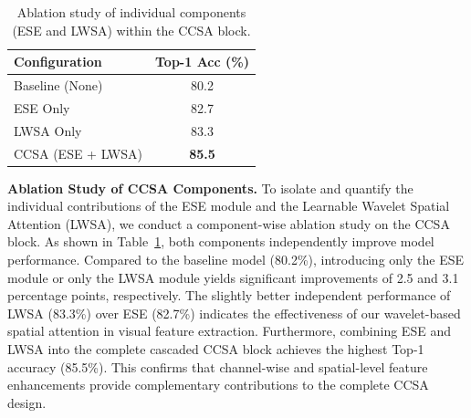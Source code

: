 \documentclass[a4paper,fleqn]{cas-dc}
\begin{document}
\begin{table}[pos=h]
\centering
\caption{{Ablation study of individual components (ESE and LWSA) within the CCSA block.}}
\label{tab:component_ablation}
\begin{tabular}{lc}
\toprule
\textbf{Configuration} & \textbf{Top-1 Acc (\%)} \\
\midrule
Baseline (None)     & 80.2 \\
ESE Only            & 82.7 \\
LWSA Only           & 83.3 \\
\rowcolor[gray]{0.92}
CCSA (ESE + LWSA)   & \textbf{85.5} \\
\bottomrule
\end{tabular}
\end{table}




{\textbf{Ablation Study of CCSA Components.} 
To isolate and quantify the individual contributions of the ESE module and the Learnable Wavelet Spatial Attention (LWSA), we conduct a component-wise ablation study on the CCSA block. As shown in Table~\ref{tab:component_ablation}, both components independently improve model performance. 
Compared to the baseline model (80.2\%), introducing only the ESE module or only the LWSA module yields significant improvements of 2.5 and 3.1 percentage points, respectively. The slightly better independent performance of LWSA (83.3\%) over ESE (82.7\%) indicates the effectiveness of our wavelet-based spatial attention in visual feature extraction. Furthermore, combining ESE and LWSA into the complete cascaded CCSA block achieves the highest Top-1 accuracy (85.5\%). This confirms that channel-wise and spatial-level feature enhancements provide complementary contributions to the complete CCSA design.}







\begin{table}[pos=h]
    \centering
    \caption{{\textit{{Ablation study of filter types on COCO object detection (RetinaNet 1x schedule).}}}}
    \label{tab:coco_filter_ablation}
    \setlength{\tabcolsep}{3pt}
\end{table}
\end{document}
